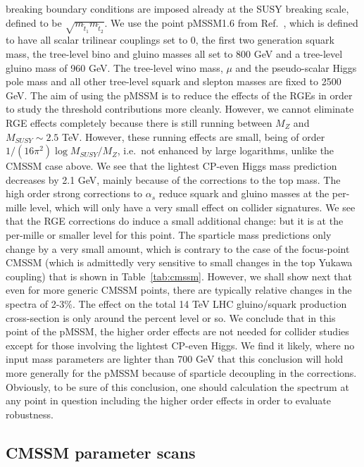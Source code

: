 \documentclass[final,3p,times,pdflatex]{elsarticle}
\begin{document}
breaking 
boundary conditions are imposed already at the SUSY breaking scale, defined to 
be $\sqrt{m_{{\tilde t}_1} m_{{\tilde t}_2}}$. We use the point pMSSM1.6 from
Ref.~\cite{AbdusSalam:2011fc}, which is defined to have all scalar trilinear
couplings set to 0, the first two generation squark mass, 
the tree-level bino and gluino masses all set to 800 GeV and a tree-level gluino
mass of 960 GeV. The tree-level wino mass, $\mu$ and the pseudo-scalar Higgs
pole mass and all other tree-level squark and slepton masses are fixed to 2500
GeV. The aim of using the pMSSM is to reduce the effects of the RGEs in order
to study the threshold contributions more cleanly. However, we cannot
eliminate RGE effects completely because there is still running between 
$M_Z$ and $M_{SUSY} \sim 2.5$ TeV. However, these running effects are small,
being of order 
$1/(16 \pi^2) \log M_{SUSY}/M_Z$, i.e.\ not enhanced by large logarithms,
unlike the CMSSM case above. 
We see that the lightest CP-even Higgs mass prediction decreases by 2.1 GeV,
mainly because of the  corrections to the top mass. The high order strong
corrections to $\alpha_s$ reduce
squark and gluino masses at the per-mille level, which will only have a very
small effect on collider signatures. 
We see that the RGE corrections do induce a small additional change: but it is
at the per-mille or smaller level for this point.
The sparticle mass predictions only change by a
very small amount, which is contrary to the case of the focus-point CMSSM
(which is 
admittedly very sensitive to small changes in the top Yukawa coupling) that is
shown in Table~\ref{tab:cmssm}. However, we shall show next that even for more
generic CMSSM points, there are typically relative changes in the spectra of
2-3$\%$. 
The effect on the total 14 TeV LHC gluino/squark production cross-section is
only  around the percent level or so.
We conclude that in this point of the pMSSM, the higher order effects are not
needed for collider studies except for those involving the lightest CP-even
Higgs. We find it likely, where no input mass parameters are lighter
than 700 GeV that this conclusion will hold more generally for the
pMSSM because of sparticle decoupling in the corrections. 
Obviously, to be sure of this conclusion, one should calculation the spectrum
at any point in question including
the higher order effects in order to evaluate robustness. 

\subsection{CMSSM parameter scans}
\end{document}
